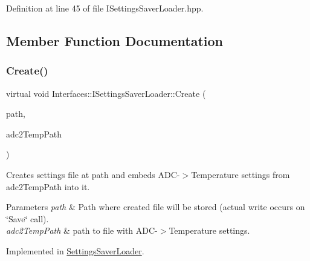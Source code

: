 Definition at line 45 of file I\+Settings\+Saver\+Loader.\+hpp.



\subsection{Member Function Documentation}
\mbox{\label{class_interfaces_1_1_i_settings_saver_loader_a67e729cc53f53b6bdeb534dc62000531}} 
\subsubsection{\texorpdfstring{Create()}{Create()}}
{\footnotesize\ttfamily virtual void Interfaces\+::\+I\+Settings\+Saver\+Loader\+::\+Create (\begin{DoxyParamCaption}\item[{Q\+String}]{path,  }\item[{Q\+String}]{adc2\+Temp\+Path }\end{DoxyParamCaption})\hspace{0.3cm}{\ttfamily [pure virtual]}}



Creates settings file at path and embeds A\+D\+C-\/$>$Temperature settings from adc2\+Temp\+Path into it. 


\begin{DoxyParams}{Parameters}
{\em path} & Path where created file will be stored (actual write occurs on \char`\"{}\+Save\char`\"{} call). \\
\hline
{\em adc2\+Temp\+Path} & path to file with A\+D\+C-\/$>$Temperature settings. \\
\hline
\end{DoxyParams}


Implemented in \hyperlink{class_settings_saver_loader_a23524241e3edea7f26b72807c0090bdc}{Settings\+Saver\+Loader}.

\mbox{\label{class_interfaces_1_1_i_settings_saver_loader_a4f855492363276d81031d931a72a49a3}} 
